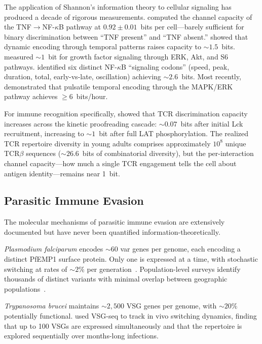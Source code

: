 \documentclass[twocolumn,10pt]{article}
\begin{document}
The application of Shannon's information theory to cellular signaling has produced a decade of rigorous measurements.  \citet{cheong2011} computed the channel capacity of the TNF$\to$NF-$\kappa$B pathway at $0.92 \pm 0.01$~bits per cell---barely sufficient for binary discrimination between ``TNF present'' and ``TNF absent.''  \citet{selimkhanov2014} showed that dynamic encoding through temporal patterns raises capacity to ${\sim}1.5$~bits.  \citet{uda2013} measured ${\sim}1$~bit for growth factor signaling through ERK, Akt, and S6 pathways.  \citet{adelaja2021} identified six distinct NF-$\kappa$B ``signaling codons'' (speed, peak, duration, total, early-vs-late, oscillation) achieving ${\sim}2.6$~bits.  Most recently, \citet{nalecz2023} demonstrated that pulsatile temporal encoding through the MAPK/ERK pathway achieves $\geq 6$~bits/hour.

For immune recognition specifically, \citet{ganti2020} showed that TCR discrimination capacity increases across the kinetic proofreading cascade: ${\sim}0.07$~bits after initial Lck recruitment, increasing to ${\sim}1$~bit after full LAT phosphorylation.  The realized TCR repertoire diversity in young adults comprises approximately $10^8$ unique TCR$\beta$ sequences (${\sim}26.6$~bits of combinatorial diversity), but the per-interaction channel capacity---how much a single TCR engagement tells the cell about antigen identity---remains near 1~bit.

\subsection{Parasitic Immune Evasion}

The molecular mechanisms of parasitic immune evasion are extensively documented but have never been quantified information-theoretically.

\textit{Plasmodium falciparum} encodes ${\sim}60$ var genes per genome, each encoding a distinct PfEMP1 surface protein.  Only one is expressed at a time, with stochastic switching at rates of ${\sim}2\%$ per generation~\citep{horrocks2004}.  Population-level surveys identify thousands of distinct variants with minimal overlap between geographic populations~\citep{barry2007,day2017,otto2019}.

\textit{Trypanosoma brucei} maintains ${\sim}2{,}500$ VSG genes per genome, with ${\sim}20\%$ potentially functional.  \citet{mugnier2015} used VSG-seq to track in vivo switching dynamics, finding that up to 100 VSGs are expressed simultaneously and that the repertoire is explored sequentially over months-long infections.
\end{document}

